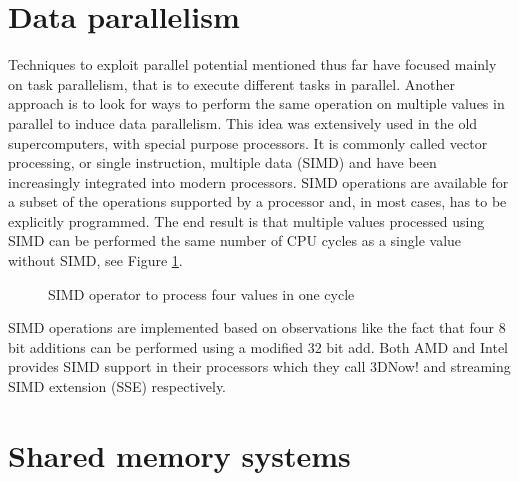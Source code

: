\documentclass[12pt,a4paper,twoside]{report}
\begin{document}
{	\section{Data parallelism}
	\label{sec:data-parallelism}

	Techniques to exploit parallel potential mentioned thus far have
	focused mainly on task parallelism, that is to execute different tasks in
	parallel. Another approach is to look for ways to perform the same
	operation on multiple values in parallel to induce data
	parallelism. This idea was extensively used in the old
	supercomputers, with special purpose processors. It is commonly
	called vector processing, or single instruction, multiple data
	(SIMD) and have been increasingly integrated into modern
	processors. SIMD operations are available for a subset of the
	operations supported by a processor and, in most cases, has to be
	explicitly programmed. The end result is that multiple values
	processed using SIMD can be performed the same number of CPU
	cycles as a single value without SIMD, see Figure \ref{fig:simd}. 
	
	\begin{figure}[H]
		\centering
		\caption{SIMD operator to process four values in one cycle}
		\label{fig:simd}
	\end{figure}

	SIMD operations are implemented based on observations like the fact that
	four 8 bit additions can be performed using a modified 32 bit add. Both AMD
	and Intel provides SIMD support in their processors which they call 3DNow!
	and streaming SIMD extension (SSE) \cite{inteloptimization} respectively.

	\section{Shared memory systems}

}
\end{document}
